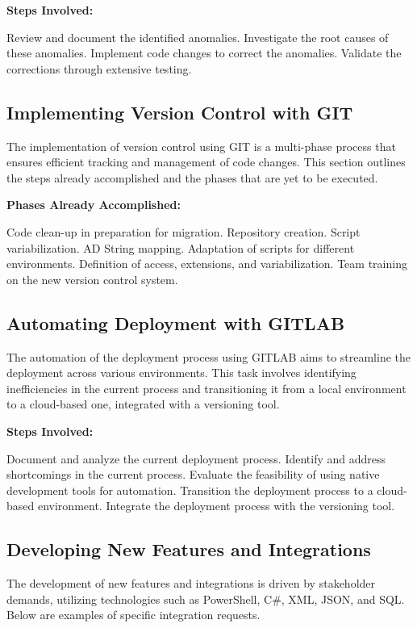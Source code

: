 \textbf{Steps Involved:}

     Review and document the identified anomalies.
     Investigate the root causes of these anomalies.
     Implement code changes to correct the anomalies.
     Validate the corrections through extensive testing.


\subsection{Implementing Version Control with GIT}

The implementation of version control using GIT is a multi-phase process that ensures efficient tracking and management of code changes. This section outlines the steps already accomplished and the phases that are yet to be executed.

\textbf{Phases Already Accomplished:}

     Code clean-up in preparation for migration.
     Repository creation.
     Script variabilization.
     AD String mapping.
     Adaptation of scripts for different environments.
     Definition of access, extensions, and variabilization.
     Team training on the new version control system.


\subsection{Automating Deployment with GITLAB}

The automation of the deployment process using GITLAB aims to streamline the deployment across various environments. This task involves identifying inefficiencies in the current process and transitioning it from a local environment to a cloud-based one, integrated with a versioning tool.

\textbf{Steps Involved:}

     Document and analyze the current deployment process.
     Identify and address shortcomings in the current process.
     Evaluate the feasibility of using native development tools for automation.
     Transition the deployment process to a cloud-based environment.
     Integrate the deployment process with the versioning tool.


\subsection{Developing New Features and Integrations}

The development of new features and integrations is driven by stakeholder demands, utilizing technologies such as PowerShell, C\#, XML, JSON, and SQL. Below are examples of specific integration requests.

